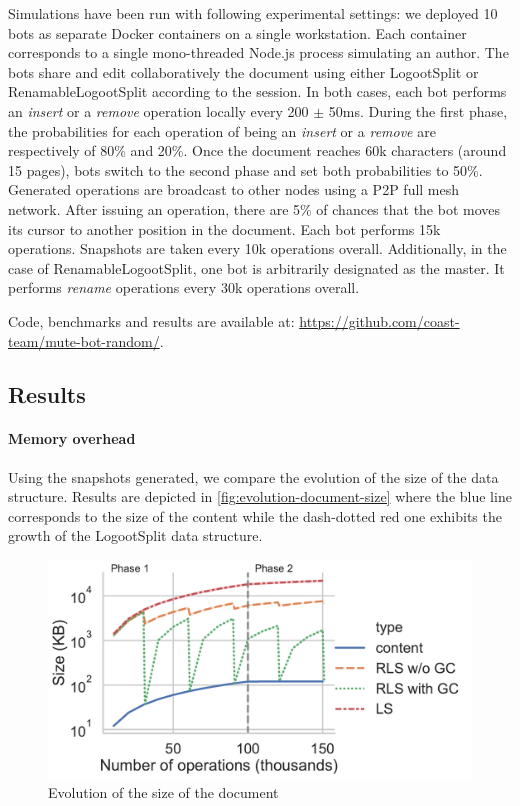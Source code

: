 \documentclass[sigplan,10pt]{acmart}
\begin{document}
Simulations have been run with following experimental settings: we deployed 10 bots as separate Docker containers on a single workstation.
Each container corresponds to a single mono-threaded Node.js process simulating an author.
The bots share and edit collaboratively the document using either LogootSplit or RenamableLogootSplit according to the session.
In both cases, each bot performs an \emph{insert} or a \emph{remove} operation locally every 200 $\pm$ 50ms.
During the first phase, the probabilities for each operation of being an \emph{insert} or a \emph{remove} are respectively of 80\% and 20\%.
Once the document reaches 60k characters (around 15 pages), bots switch to the second phase and set both probabilities to 50\%.
Generated operations are broadcast to other nodes using a \ac{P2P} full mesh network.
After issuing an operation, there are 5\% of chances that the bot moves its cursor to another position in the document.
Each bot performs 15k operations.
Snapshots are taken every 10k operations overall.
Additionally, in the case of RenamableLogootSplit, one bot is arbitrarily designated as the master.
It performs \emph{rename} operations every 30k operations overall.

Code, benchmarks and results are available at: \url{https://github.com/coast-team/mute-bot-random/}.

\subsection{Results}

\paragraph{Memory overhead}

Using the snapshots generated, we compare the evolution of the size of the data structure.
Results are depicted in \autoref{fig:evolution-document-size} where the blue line corresponds to the size of the content while the dash-dotted red one exhibits the growth of the LogootSplit data structure.

\begin{figure}[ht!]
    \centering
    \includegraphics[width=\columnwidth]{img/snapshots-sizes.pdf}
    \caption{Evolution of the size of the document}
    \label{fig:evolution-document-size}
\end{figure}
\end{document}

